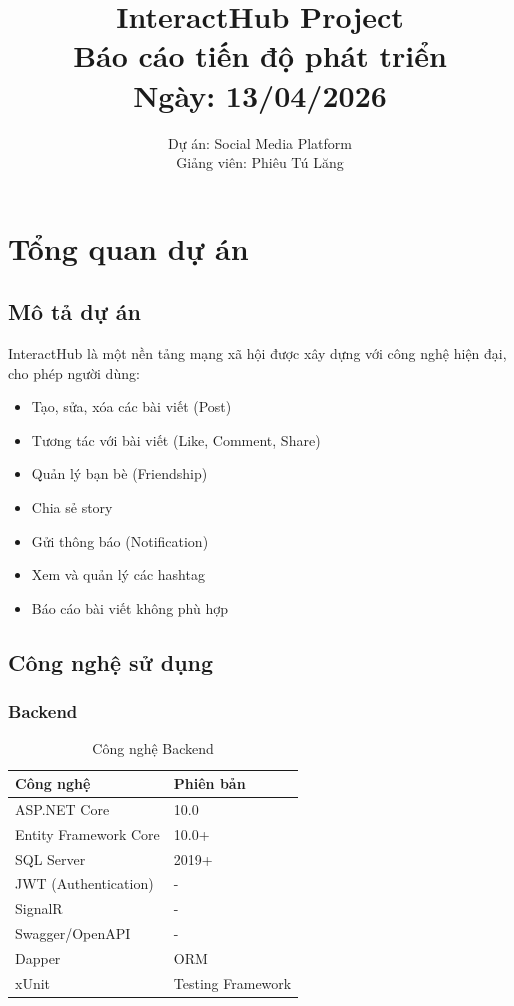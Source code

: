 \documentclass[12pt,a4paper]{report}
\title{\textbf{\Huge InteractHub Project} \\ \Large Báo cáo tiến độ phát triển \\ \normalsize Ngày: 13/04/2026}
\author{Dự án: Social Media Platform \\ Giảng viên: Phiêu Tú Lăng}
\date{}
\begin{document}
\maketitle

\newpage
\tableofcontents
\newpage

\chapter{Tổng quan dự án}

\section{Mô tả dự án}
InteractHub là một nền tảng mạng xã hội được xây dựng với công nghệ hiện đại, cho phép người dùng:
\begin{itemize}
    \item Tạo, sửa, xóa các bài viết (Post)
    \item Tương tác với bài viết (Like, Comment, Share)
    \item Quản lý bạn bè (Friendship)
    \item Chia sẻ story
    \item Gửi thông báo (Notification)
    \item Xem và quản lý các hashtag
    \item Báo cáo bài viết không phù hợp
\end{itemize}

\section{Công nghệ sử dụng}

\subsection{Backend}
\begin{table}[h]
    \centering
    \begin{tabular}{|l|l|}
        \hline
        \rowcolor{lightblue}
        \textbf{Công nghệ} & \textbf{Phiên bản} \\
        \hline
        ASP.NET Core & 10.0 \\
        Entity Framework Core & 10.0+ \\
        SQL Server & 2019+ \\
        JWT (Authentication) & - \\
        SignalR & - \\
        Swagger/OpenAPI & - \\
        Dapper & ORM \\
        xUnit & Testing Framework \\
        \hline
    \end{tabular}
    \caption{Công nghệ Backend}
\end{table}
\end{document}

